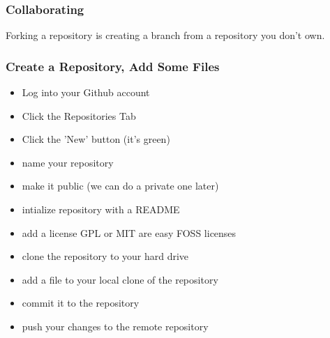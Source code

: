 \documentclass[xcolor=dvipsnames]{beamer}
\begin{document}

%





\begin{frame}
\frametitle{Collaborating}
Forking a repository is creating a branch from a repository you don't own.
\end{frame}

\begin{frame}
\frametitle{Create a Repository, Add Some Files}
\begin{itemize}
\item Log into your Github account
\item Click the Repositories Tab
\item Click the 'New' button (it's green)
\item name your repository
\item make it public (we can do a private one later)
\item intialize repository with a README
\item add a license GPL or MIT are easy FOSS licenses
\item clone the repository to your hard drive
\item add a file to your local clone of the repository
\item commit it to the repository
\item push your changes to the remote repository
\end{itemize}
\end{frame}
\end{document}
